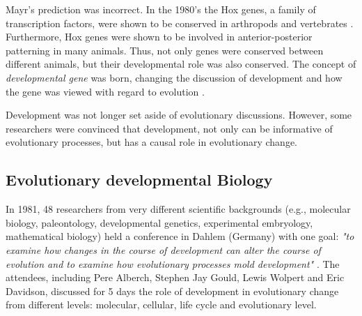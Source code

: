 Mayr's prediction was incorrect. In the 1980's the Hox genes, a family of transcription factors, were shown to be conserved in arthropods and vertebrates \citep{McGinnis1984,Duboule1989}.
Furthermore, Hox genes were shown to be involved in anterior-posterior patterning in many animals.
Thus, not only genes were conserved between different animals, but their developmental role was also conserved. 
The concept of \textit{developmental gene} was born, changing the discussion of development and how the gene was viewed with regard to evolution \citep{gilbert2000developmentalgene}.

Development was not longer set aside of evolutionary discussions. However, some researchers were convinced that development, not only can be informative of evolutionary processes, but has a causal role in evolutionary change.

\subsection{Evolutionary developmental Biology}

In 1981, 48 researchers from very different scientific backgrounds (e.g., molecular biology, paleontology, developmental genetics, experimental embryology, mathematical biology) 
held a conference in Dahlem (Germany) with one goal: 
\textit{"to examine how changes in the course of development can alter the course of evolution and to examine how evolutionary processes mold development"} \citep{bonner1982evolution}.
%
The attendees, including Pere Alberch, Stephen Jay Gould, Lewis Wolpert and Eric Davidson, discussed for 5 days the role of development in evolutionary change from different levels: molecular, cellular, life cycle and evolutionary level.



